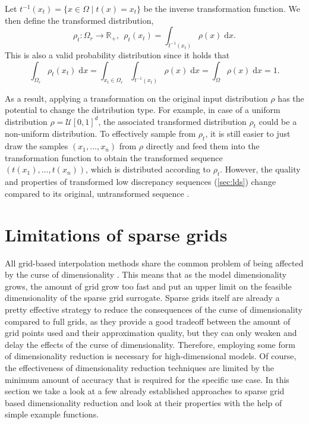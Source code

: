 \documentclass[
  a4paper,  %
  twoside,  %
  bibliography=totoc,
  headsepline,
  cleardoublepage=empty,
  parskip=half,
  draft=false
]{scrbook}
\begin{document}
\begin{definition}
Let $t^{-1}(x_{t})=\{x \in \Omega \mid t(x)=x_{t}\}$ be the inverse transformation function.
We then define the transformed distribution,
\begin{equation}
\rho_t \colon \Omega_r \to \mathds{R_+}, ~~ \rho_t(x_t)=\int_{t^{-1}(x_t)} \rho(x) \; \mathrm{d}x.
\end{equation}
This is also a valid probability distribution since it holds that
\begin{equation}
\int_{\Omega_r} \rho_t(x_t) \; \mathrm{d}x=\int_{x_t \in \Omega_r} \int_{t^{-1}(x_t)} \rho(x) \; \mathrm{d}x = \int_{\Omega} \rho(x) \; \mathrm{d}x = 1.
\end{equation}
\end{definition}
%
As a result, applying a transformation on the original input distribution $\rho$ has the potential to change the distribution type.
For example, in case of a uniform distribution $\rho=\mathcal{U}[0,1]^d$, the associated transformed distribution $\rho_t$ could be a non-uniform distribution.
To effectively sample from $\rho_t$, it is still easier to just draw the samples $(x_1, \dots, x_n)$ from $\rho$ directly and feed them into the transformation function to obtain the transformed sequence $(t(x_1), \dots, t(x_n))$, which is distributed according to $\rho_t$.
However, the quality and properties of transformed low discrepancy sequences (\cref{sec:lds}) change compared to its original, untransformed sequence \cite{Wang2008}.

\section{Limitations of sparse grids}

All grid-based interpolation methods share the common problem of being affected by the curse of dimensionality \cite{Bellman1961}.
This means that as the model dimensionality grows, the amount of grid grow too fast and put an upper limit on the feasible dimensionality of the sparse grid surrogate.
Sparse grids itself are already a pretty effective strategy to reduce the consequences of the curse of dimensionality compared to full grids, as they provide a good tradeoff between the amount of grid points used and their approximation quality, but they can only weaken and delay the effects of the curse of dimensionality.
Therefore, employing some form of dimensionality reduction is necessary for high-dimensional models.
Of course, the effectiveness of dimensionality reduction techniques are limited by the minimum amount of accuracy that is required for the specific use case.
In this section we take a look at a few already established approaches to sparse grid based dimensionality reduction and look at their properties with the help of simple example functions.
\end{document}
